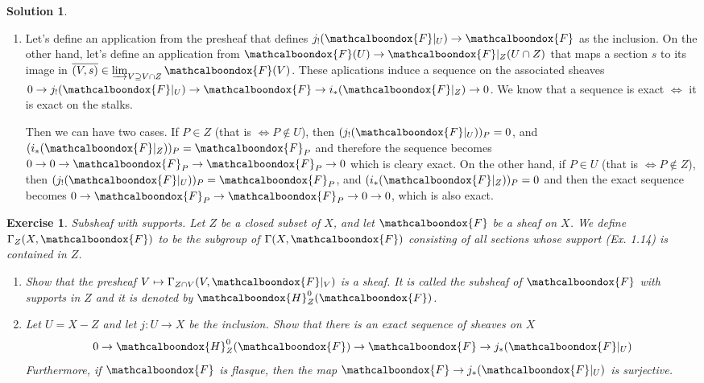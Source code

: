 \documentclass[12pt]{article}
\newtheorem{ex}{Exercise}[section]
\theoremstyle{definition}
\newtheorem*{sol}{Solution}
\newcommand{\sF}{\ensuremath{\mathcalboondox{F}}}
\newcommand{\sH}{\ensuremath{\mathcalboondox{H}}}
\begin{document}
\begin{sol}
\begin{enumerate}[label=\alph*)]
		\item Let's define an application from the presheaf that defines $j_{!}(\sF|_{U}) \to \sF$ as the inclusion. On the other hand, let's define an application from $\sF(U) \to \sF|_Z (U \cap Z)$ that maps a section $s$ to its image in $\overline{(V,s)} \in \varinjlim_{V \supseteq V \cap Z} \sF(V)$.  These aplications induce a sequence on the associated sheaves $0 \to j_{!}(\sF|_{U}) \to \sF \to i_{*}(\sF|_{Z}) \to 0$. We know that a sequence is exact $\iff$ it is exact on the stalks. 

		Then we can have two cases. If $P \in Z$ (that is $\iff P \notin U$), then $(j_{!}(\sF|_U))_P = 0$, and $(i_{*}(\sF|_Z))_P = \sF_P$ and therefore the sequence becomes $0 \to 0 \to \sF_P \to \sF_P \to 0$ which is cleary exact. On the other hand, if $P \in U$ (that is $\iff P \notin Z$), then $(j_{!}(\sF|_U))_P = \sF_P$, and $(i_{*}(\sF|_Z))_P = 0$ and then the exact sequence becomes $0 \to \sF_P \to \sF_P \to 0 \to 0$, which is also exact.

	\end{enumerate}

\end{sol}

\begin{ex}
	Subsheaf with supports. Let $Z$ be a closed subset of $X$, and let $\sF$ be a sheaf on $X$. We define $\Gamma_Z(X, \sF)$ to be the subgroup of $\Gamma(X,\sF)$ consisting of all sections whose support (Ex. 1.14) is contained in $Z$.
	\begin{enumerate}[label=\alph*)]
		\item Show that the presheaf $V \mapsto \Gamma_{Z \cap V}(V, \sF|_V)$ is a sheaf. It is called the subsheaf of $\sF$ with supports in $Z$ and it is denoted by $\sH^{0}_Z(\sF)$.

		\item Let $U = X-Z$ and let $j: U \to X$ be the inclusion. Show that there is an exact sequence of sheaves on $X$
		\[
		 0 \to \sH^{0}_Z(\sF) \to \sF \to j_{*}(\sF|_U)
		\]
		Furthermore, if $\sF$ is flasque, then the map $\sF \to j_{*}(\sF|_U)$ is surjective.
	\end{enumerate}
\end{ex}
\end{document}
